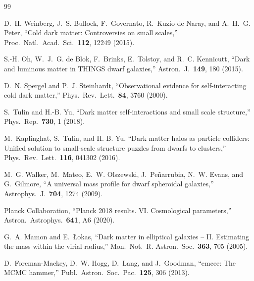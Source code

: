 \begin{thebibliography}{99}

D.~H. Weinberg, J.~S. Bullock, F.~Governato, R.~Kuzio de Naray, and
A.~H.~G. Peter,
``Cold dark matter: Controversies on small scales,''
Proc.\ Natl.\ Acad.\ Sci.\ \textbf{112}, 12249 (2015).

S.-H. Oh, W.~J.~G. de Blok, F.~Brinks, E.~Tolstoy, and R.~C. Kennicutt,
``Dark and luminous matter in THINGS dwarf galaxies,''
Astron.\ J.\ \textbf{149}, 180 (2015).

D.~N. Spergel and P.~J. Steinhardt,
``Observational evidence for self-interacting cold dark matter,''
Phys.\ Rev.\ Lett.\ \textbf{84}, 3760 (2000).

S.~Tulin and H.-B. Yu,
``Dark matter self-interactions and small scale structure,''
Phys.\ Rep.\ \textbf{730}, 1 (2018).

M.~Kaplinghat, S.~Tulin, and H.-B. Yu,
``Dark matter halos as particle colliders: Unified solution to small-scale
structure puzzles from dwarfs to clusters,''
Phys.\ Rev.\ Lett.\ \textbf{116}, 041302 (2016).

M.~G. Walker, M.~Mateo, E.~W. Olszewski, J.~Pe\~narrubia, N.~W. Evans, and
G.~Gilmore,
``A universal mass profile for dwarf spheroidal galaxies,''
Astrophys.\ J.\ \textbf{704}, 1274 (2009).

Planck Collaboration,
``Planck 2018 results. VI. Cosmological parameters,''
Astron.\ Astrophys.\ \textbf{641}, A6 (2020).

G.~A. Mamon and E.~\L{}okas,
``Dark matter in elliptical galaxies -- II. Estimating the mass within the
virial radius,''
Mon.\ Not.\ R. Astron.\ Soc.\ \textbf{363}, 705 (2005).

D.~Foreman-Mackey, D.~W. Hogg, D.~Lang, and J.~Goodman,
``emcee: The MCMC hammer,''
Publ.\ Astron.\ Soc.\ Pac.\ \textbf{125}, 306 (2013).

\end{thebibliography}
